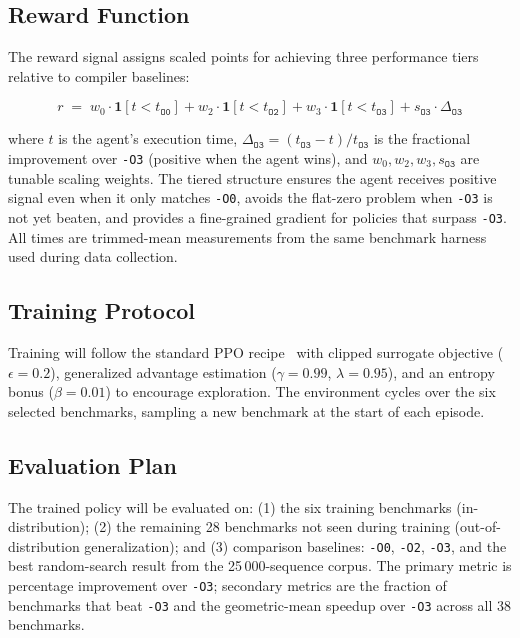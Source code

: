 \documentclass[conference]{IEEEtran}
\begin{document}
\subsection{Reward Function}

The reward signal assigns scaled points for achieving three performance tiers
relative to compiler baselines:

\begin{equation}
  r \;=\; w_0 \cdot \mathbf{1}[t < t_{\texttt{O0}}]
        + w_2 \cdot \mathbf{1}[t < t_{\texttt{O2}}]
        + w_3 \cdot \mathbf{1}[t < t_{\texttt{O3}}]
        + s_{\texttt{O3}} \cdot \Delta_{\texttt{O3}}
  \label{eq:reward}
\end{equation}

where $t$ is the agent's execution time, $\Delta_{\texttt{O3}} =
(t_{\texttt{O3}} - t)/t_{\texttt{O3}}$ is the fractional improvement over
\texttt{-O3} (positive when the agent wins), and $w_0, w_2, w_3, s_{\texttt{O3}}$
are tunable scaling weights.  The tiered structure ensures the agent receives
positive signal even when it only matches \texttt{-O0}, avoids the flat-zero
problem when \texttt{-O3} is not yet beaten, and provides a fine-grained
gradient for policies that surpass \texttt{-O3}.  All times are trimmed-mean
measurements from the same benchmark harness used during data collection.

\subsection{Training Protocol}

Training will follow the standard PPO recipe~\cite{schulman2017proximal} with
clipped surrogate objective ($\epsilon = 0.2$), generalized advantage
estimation ($\gamma = 0.99$, $\lambda = 0.95$), and an entropy bonus
($\beta = 0.01$) to encourage exploration.  The environment cycles over the
six selected benchmarks, sampling a new benchmark at the start of each
episode.

\subsection{Evaluation Plan}

The trained policy will be evaluated on: (1) the six training benchmarks
(in-distribution); (2) the remaining 28 benchmarks not seen during training
(out-of-distribution generalization); and (3) comparison baselines:
\texttt{-O0}, \texttt{-O2}, \texttt{-O3}, and the best random-search result
from the 25\,000-sequence corpus.  The primary metric is percentage improvement
over \texttt{-O3}; secondary metrics are the fraction of benchmarks that beat
\texttt{-O3} and the geometric-mean speedup over \texttt{-O3} across all 38
benchmarks.
\end{document}

